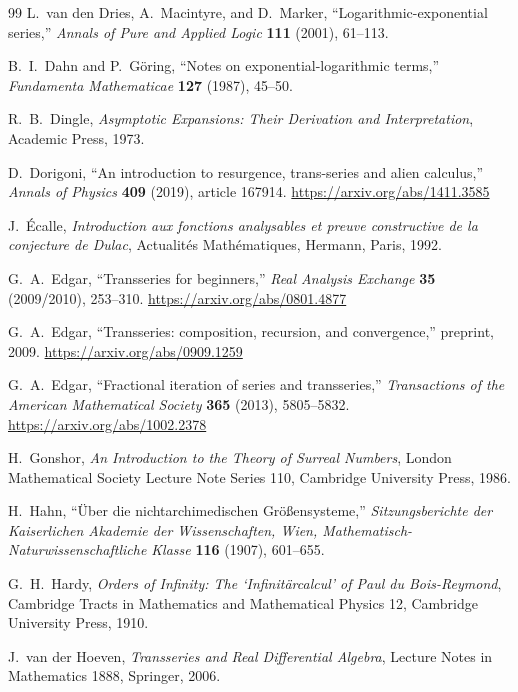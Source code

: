 \documentclass[11pt,openany]{book}
\theoremstyle{plain}
\theoremstyle{definition}
\theoremstyle{remark}
\begin{document}
\begin{thebibliography}{99}
L.~van den Dries, A.~Macintyre, and D.~Marker,
``Logarithmic-exponential series,''
\emph{Annals of Pure and Applied Logic} \textbf{111} (2001), 61--113.

B.~I.~Dahn and P.~G\"oring,
``Notes on exponential-logarithmic terms,''
\emph{Fundamenta Mathematicae} \textbf{127} (1987), 45--50.

R.~B.~Dingle,
\emph{Asymptotic Expansions: Their Derivation and Interpretation},
Academic Press, 1973.

D.~Dorigoni,
``An introduction to resurgence, trans-series and alien calculus,''
\emph{Annals of Physics} \textbf{409} (2019), article 167914.
\url{https://arxiv.org/abs/1411.3585}

J.~\'Ecalle,
\emph{Introduction aux fonctions analysables et preuve constructive de la conjecture de Dulac},
Actualit\'es Math\'ematiques, Hermann, Paris, 1992.

G.~A.~Edgar,
``Transseries for beginners,''
\emph{Real Analysis Exchange} \textbf{35} (2009/2010), 253--310.
\url{https://arxiv.org/abs/0801.4877}

G.~A.~Edgar,
``Transseries: composition, recursion, and convergence,''
preprint, 2009.
\url{https://arxiv.org/abs/0909.1259}

G.~A.~Edgar,
``Fractional iteration of series and transseries,''
\emph{Transactions of the American Mathematical Society} \textbf{365} (2013), 5805--5832.
\url{https://arxiv.org/abs/1002.2378}

H.~Gonshor,
\emph{An Introduction to the Theory of Surreal Numbers},
London Mathematical Society Lecture Note Series 110, Cambridge University Press, 1986.

H.~Hahn,
``\"Uber die nichtarchimedischen Gr\"o\ss ensysteme,''
\emph{Sitzungsberichte der Kaiserlichen Akademie der Wissenschaften, Wien, Mathematisch-Naturwissenschaftliche Klasse} \textbf{116} (1907), 601--655.

G.~H.~Hardy,
\emph{Orders of Infinity: The `Infinit\"arcalcul' of Paul du Bois-Reymond},
Cambridge Tracts in Mathematics and Mathematical Physics 12, Cambridge University Press, 1910.

J.~van der Hoeven,
\emph{Transseries and Real Differential Algebra},
Lecture Notes in Mathematics 1888, Springer, 2006.


\end{thebibliography}
\end{document}

